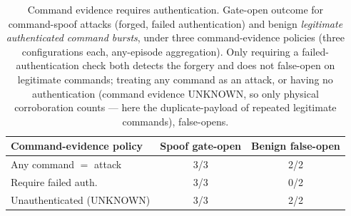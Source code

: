 \begin{table}[t]\centering\small
\caption{Command evidence requires authentication. Gate-open outcome for command-spoof attacks (forged, failed authentication) and benign \emph{legitimate authenticated command bursts}, under three command-evidence policies (three configurations each, any-episode aggregation). Only requiring a failed-authentication check both detects the forgery and does not false-open on legitimate commands; treating any command as an attack, or having no authentication (command evidence UNKNOWN, so only physical corroboration counts --- here the duplicate-payload of repeated legitimate commands), false-opens.}
\label{tab:gate-auth}
\begin{tabular}{lcc}
\toprule
Command-evidence policy & Spoof gate-open & Benign false-open \\
\midrule
Any command $=$ attack & 3/3 & 2/2 \\
Require failed auth. & 3/3 & 0/2 \\
Unauthenticated (UNKNOWN) & 3/3 & 2/2 \\
\bottomrule
\end{tabular}
\end{table}
